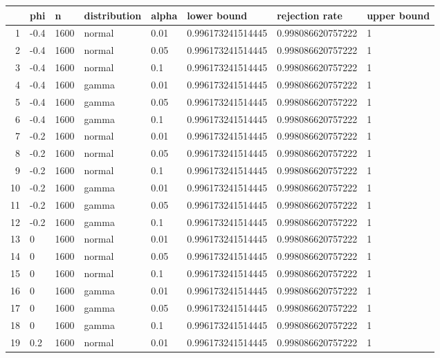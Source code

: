 \begin{table}[ht]
\centering
\begin{tabular}{rlllllll}
  \hline
 & phi & n & distribution & alpha & lower bound & rejection rate & upper bound \\ 
  \hline
1 & -0.4 & 1600 & normal & 0.01 & 0.996173241514445 & 0.998086620757222 & 1 \\ 
  2 & -0.4 & 1600 & normal & 0.05 & 0.996173241514445 & 0.998086620757222 & 1 \\ 
  3 & -0.4 & 1600 & normal & 0.1 & 0.996173241514445 & 0.998086620757222 & 1 \\ 
  4 & -0.4 & 1600 & gamma & 0.01 & 0.996173241514445 & 0.998086620757222 & 1 \\ 
  5 & -0.4 & 1600 & gamma & 0.05 & 0.996173241514445 & 0.998086620757222 & 1 \\ 
  6 & -0.4 & 1600 & gamma & 0.1 & 0.996173241514445 & 0.998086620757222 & 1 \\ 
  7 & -0.2 & 1600 & normal & 0.01 & 0.996173241514445 & 0.998086620757222 & 1 \\ 
  8 & -0.2 & 1600 & normal & 0.05 & 0.996173241514445 & 0.998086620757222 & 1 \\ 
  9 & -0.2 & 1600 & normal & 0.1 & 0.996173241514445 & 0.998086620757222 & 1 \\ 
  10 & -0.2 & 1600 & gamma & 0.01 & 0.996173241514445 & 0.998086620757222 & 1 \\ 
  11 & -0.2 & 1600 & gamma & 0.05 & 0.996173241514445 & 0.998086620757222 & 1 \\ 
  12 & -0.2 & 1600 & gamma & 0.1 & 0.996173241514445 & 0.998086620757222 & 1 \\ 
  13 & 0 & 1600 & normal & 0.01 & 0.996173241514445 & 0.998086620757222 & 1 \\ 
  14 & 0 & 1600 & normal & 0.05 & 0.996173241514445 & 0.998086620757222 & 1 \\ 
  15 & 0 & 1600 & normal & 0.1 & 0.996173241514445 & 0.998086620757222 & 1 \\ 
  16 & 0 & 1600 & gamma & 0.01 & 0.996173241514445 & 0.998086620757222 & 1 \\ 
  17 & 0 & 1600 & gamma & 0.05 & 0.996173241514445 & 0.998086620757222 & 1 \\ 
  18 & 0 & 1600 & gamma & 0.1 & 0.996173241514445 & 0.998086620757222 & 1 \\ 
  19 & 0.2 & 1600 & normal & 0.01 & 0.996173241514445 & 0.998086620757222 & 1 \\ 

\end{tabular}
\end{table}
